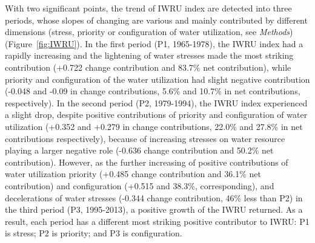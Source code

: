 \documentclass[9pt, twocolumn, twoside, lineno]{pnas-new}
\begin{document}
With two significant points, the trend of IWRU index are detected into three periods, whose slopes of changing are various and mainly contributed by different dimensions (stress, priority or configuration of water utilization, see \textit{Methods}) (Figure~\ref{fig:IWRU}).
In the first period (P1, 1965-1978), the IWRU index had a rapidly increasing and the lightening of water stresses made the most striking contribution (+0.722 change contribution and 83.7\% net contribution), while priority and configuration of the water utilization had slight negative contribution (-0.048 and -0.09 in change contributions, 5.6\% and 10.7\% in net contributions, respectively).
In the second period (P2, 1979-1994), the IWRU index experienced a slight drop, despite positive contributions of priority and configuration of water utilization (+0.352 and +0.279 in change contributions, 22.0\% and 27.8\% in net contributions respectively), because of increasing stresses on water resource playing a larger negative role (-0.636 change contribution and 50.2\% net contribution). 
However, as the further increasing of positive contributions of water utilization priority (+0.485 change contribution and 36.1\% net contribution) and configuration (+0.515 and 38.3\%, corresponding), and decelerations of water stresses (-0.344 change contribution, 46\% less than P2) in the third period (P3, 1995-2013), a positive growth of the IWRU returned.
As a result, each period has a different most striking positive contributor to IWRU: P1 is stress; P2 is priority; and P3 is configuration.
\end{document}
